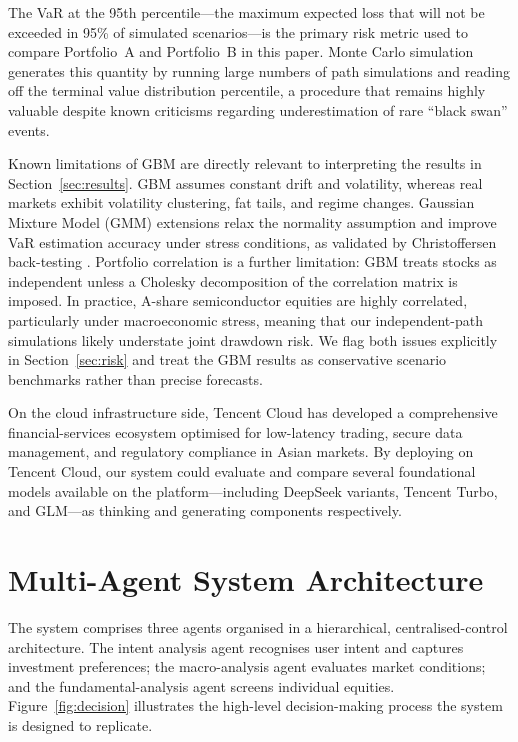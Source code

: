 \documentclass[11pt,a4paper]{article}
\begin{document}
The VaR at the 95th percentile---the maximum expected loss that will
not be exceeded in 95\% of simulated scenarios---is the primary risk
metric used to compare Portfolio~A and Portfolio~B in this paper.
Monte Carlo simulation generates this quantity by running large numbers
of path simulations and reading off the terminal value distribution
percentile, a procedure that remains highly valuable despite known
criticisms regarding underestimation of rare ``black swan'' events.

Known limitations of GBM are directly relevant to interpreting the
results in Section~\ref{sec:results}. GBM assumes constant drift and
volatility, whereas real markets exhibit volatility clustering, fat
tails, and regime changes. Gaussian Mixture Model (GMM) extensions
relax the normality assumption and improve VaR estimation accuracy
under stress conditions, as validated by Christoffersen back-testing
\cite{gmm2021var}. Portfolio correlation is a further limitation: GBM
treats stocks as independent unless a Cholesky decomposition of the
correlation matrix is imposed. In practice, A-share semiconductor
equities are highly correlated, particularly under macroeconomic stress,
meaning that our independent-path simulations likely understate joint
drawdown risk. We flag both issues explicitly in
Section~\ref{sec:risk} and treat the GBM results as conservative
scenario benchmarks rather than precise forecasts.

On the cloud infrastructure side, Tencent Cloud has developed a
comprehensive financial-services ecosystem optimised for low-latency
trading, secure data management, and regulatory compliance in Asian
markets. By deploying on Tencent Cloud, our system could evaluate and
compare several foundational models available on the platform---including
DeepSeek variants, Tencent Turbo, and GLM---as thinking and generating
components respectively.

\section{Multi-Agent System Architecture}
\label{sec:architecture}

The system comprises three agents organised in a hierarchical,
centralised-control architecture. The intent analysis agent recognises
user intent and captures investment preferences; the macro-analysis
agent evaluates market conditions; and the fundamental-analysis agent
screens individual equities. Figure~\ref{fig:decision} illustrates the
high-level decision-making process the system is designed to replicate.
\end{document}
